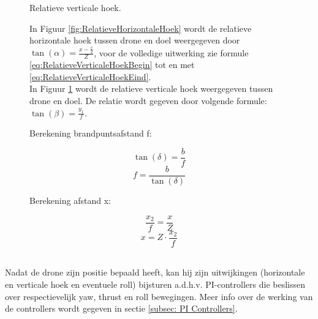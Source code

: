\begin{figure}[h]
\begin{minipage}{.45\textwidth}
		\caption{Relatieve verticale hoek.}
		\label{fig:RelatieveVerticaleHoek}
	\end{minipage}%
	\caption*{In Figuur \ref{fig:RelatieveHorizontaleHoek} wordt de relatieve horizontale hoek tussen drone en doel weergegeven door \(\tan(\alpha) = \frac{x-\frac{c}{2}}{Z}\), voor de volledige uitwerking zie formule \ref{eq:RelatieveVerticaleHoekBegin} tot en met \ref{eq:RelatieveVerticaleHoekEind}.\\
		In Figuur \ref{fig:RelatieveVerticaleHoek} wordt de relatieve verticale hoek weergegeven tussen drone en doel. De relatie wordt gegeven door volgende formule: \(\tan(\beta) = \frac{y_1}{f}\).}
\end{figure}
\begin{figure}[h]
	\centering
	\begin{minipage}{.45\textwidth}
	\begin{center}
			Berekening brandpuntsafstand f:
	\end{center}
		\begin{equation} \label{eq:RelatieveVerticaleHoekBegin}
		\tan(\delta) = \frac{b}{f}
		\end{equation}
		\begin{equation} 
		f = \frac{b}{\tan(\delta)}
		\end{equation}
	\end{minipage}
	\begin{minipage}{.45\textwidth}
		\begin{center}
			Berekening afstand x:
		\end{center}
		\begin{equation} 
		\frac{x_2}{f} = \frac{x}{Z}
		\end{equation}
		\begin{equation} \label{eq:RelatieveVerticaleHoekEind}
		x = Z \cdot \frac{x_2}{f}	
		\end{equation}
	\end{minipage}%
\end{figure}
\\
Nadat de drone zijn positie bepaald heeft, kan hij zijn uitwijkingen (horizontale en verticale hoek en eventuele roll) bijsturen a.d.h.v. PI-controllers die beslissen over respectievelijk yaw, thrust en roll bewegingen. Meer info over de werking van de controllers wordt gegeven in sectie \ref{subsec: PI Controllers}. 
\\
\\

